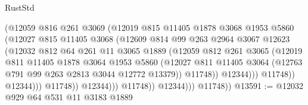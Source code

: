 \begin{lexlean}{RustStd}
\begin{coremodule}
{\begin{coremodule}
{{{{{{{{{{{{{{{{{{{{{{{{{{{{{                                  (@12059
                                    @816
                                    @261
                                    @3069
                                    (@12019
                                      @815
                                      @11405
                                      @1878
                                      @3068
                                      @1953
                                      @5860
                                      (@12027
                                        @815
                                        @11405
                                        @3068
                                        (@12609
                                          @814
                                          @99
                                          @263
                                          @2964
                                          @3067
                                          @12623
                                          (@12032
                                            @812
                                            @64
                                            @261
                                            @11
                                            @3065
                                            @1889
                                            (@12059
                                              @812
                                              @261
                                              @3065
                                              (@12019
                                                @811
                                                @11405
                                                @1878
                                                @3064
                                                @1953
                                                @5860
                                                (@12027
                                                  @811
                                                  @11405
                                                  @3064
                                                  (@12763 @791 @99 @263 @2813 @3044 @12772 @13379))
                                                @11748))
                                            @12344)))
                                      @11748))
                                  @12344)))
                            @11748))
                        @12344)))
                  @11748))
              @12344)))
        @11748))
@13591 := @12032 @929 @64 @531 @11 @3183 @1889
}}}}}}}}}}}}}}}}}}}}}}}}}}}}}
\end{coremodule}}
\end{coremodule}
\end{lexlean}
